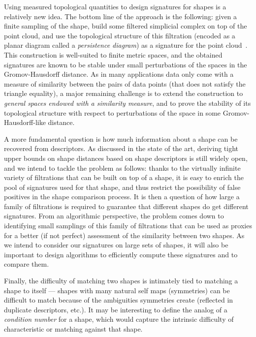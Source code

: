 Using measured topological quantities to design signatures for shapes
is a relatively new idea. The bottom line of the approach is the
following: given a finite sampling of the shape, build some filtered
simplicial complex on top of the point cloud, and use the topological
structure of this filtration (encoded as a planar diagram called a
{\em persistence diagram}) as a signature for the point
cloud~\cite{ccgmo-ghsssp-09, socg-pbsds-10}. This construction is
well-suited to finite metric spaces, and the obtained signatures are
known to be stable under small perturbations of the spaces in the
Gromov-Hausdorff distance.  
As in many applications data only come with a measure of similarity between the pairs of data points  (that does not satisfy the triangle equality), 
a major remaining challenge is to extend the construction to {\em general spaces endowed with a similarity measure},
and to prove the stability of
its topological structure with respect to perturbations of the space
in some Gromov-Hausdorff-like distance.

A more fundamental question is how much information about a shape can
be recovered from descriptors. As discussed in the state of the art,
deriving tight upper bounds on shape distances based on shape descriptors is
still widely open, and we intend to tackle the problem as
follows: thanks to the virtually infinite variety of filtrations that
can be built on top of a shape, it is easy to enrich the pool of
signatures used for that shape, and thus restrict the possibility of
false positives in the shape comparison process. It is then a question
of how large a family of filtrations is required to guarantee that
different shapes do get different signatures. From an algorithmic
perspective, the problem comes down to identifying small samplings of this
family of filtrations that can be used as proxies for a better (if not
perfect) assessment of the similarity between two shapes.  As we
intend to consider our signatures on large sets of shapes, it will
also be important to design algorithms to efficiently compute these
signatures and to compare them.%

Finally, the difficulty of matching two shapes is
intimately tied to matching a shape to itself --- shapes with many
natural self maps (symmetries) can be difficult to match because of
the ambiguities symmetries create (reflected in duplicate descriptors,
etc.). It may be interesting to define the analog of a {\em condition
  number} for a shape, which would capture the intrinsic difficulty of
characteristic or matching against that shape.




